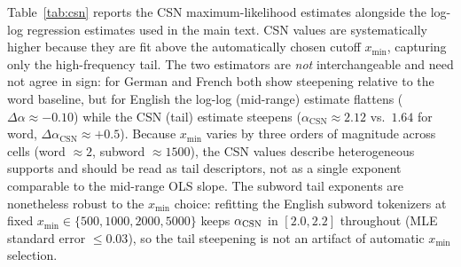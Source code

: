 \documentclass{article}
\begin{document}
Table~\ref{tab:csn} reports the CSN maximum-likelihood estimates alongside the log-log
regression estimates used in the main text. CSN values are systematically higher because
they are fit above the automatically chosen cutoff $x_{\min}$, capturing only the
high-frequency tail. The two estimators are \emph{not} interchangeable and need not agree
in sign: for German and French both show steepening relative to the word baseline, but for
English the log-log (mid-range) estimate flattens ($\Delta\alpha \approx -0.10$) while the
CSN (tail) estimate steepens ($\alpha_{\text{CSN}} \approx 2.12$ vs.\ $1.64$ for word,
$\Delta\alpha_{\text{CSN}} \approx +0.5$). Because $x_{\min}$ varies by three orders of
magnitude across cells (word $\approx 2$, subword $\approx 1500$), the CSN values describe
heterogeneous supports and should be read as tail descriptors, not as a single exponent
comparable to the mid-range OLS slope. The subword tail exponents are nonetheless robust
to the $x_{\min}$ choice: refitting the English subword tokenizers at fixed
$x_{\min} \in \{500, 1000, 2000, 5000\}$ keeps $\alpha_{\rm CSN}$ in $[2.0, 2.2]$
throughout (MLE standard error $\leq 0.03$), so the tail steepening is not an artifact of
automatic $x_{\min}$ selection.
\end{document}
